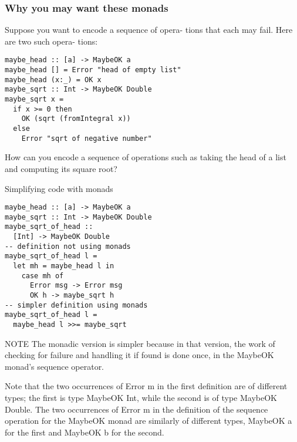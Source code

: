 \subsubsection{Why you may want these monads}
Suppose you want to encode a sequence of opera-
tions that each may fail. Here are two such opera-
tions:
\begin{lstlisting}
maybe_head :: [a] -> MaybeOK a
maybe_head [] = Error "head of empty list"
maybe_head (x:_) = OK x
maybe_sqrt :: Int -> MaybeOK Double
maybe_sqrt x =
  if x >= 0 then
    OK (sqrt (fromIntegral x))
  else
    Error "sqrt of negative number"
\end{lstlisting}
How can you encode a sequence of operations such
as taking the head of a list and computing its square
root?

Simplifying code with monads
\begin{lstlisting}
maybe_head :: [a] -> MaybeOK a
maybe_sqrt :: Int -> MaybeOK Double
maybe_sqrt_of_head ::
  [Int] -> MaybeOK Double
-- definition not using monads
maybe_sqrt_of_head l =
  let mh = maybe_head l in
    case mh of
      Error msg -> Error msg
      OK h -> maybe_sqrt h
-- simpler definition using monads
maybe_sqrt_of_head l =
  maybe_head l >>= maybe_sqrt
\end{lstlisting}
NOTE The monadic version is simpler because in
that version, the work of checking for failure and
handling it if found is done once, in the MaybeOK
monad’s sequence operator.

Note that the two occurrences of Error m in the
first definition are of different types; the first is type
MaybeOK Int, while the second is of type MaybeOK
Double. The two occurrences of Error m in the
definition of the sequence operation for the MaybeOK
monad are similarly of different types, MaybeOK a
for the first and MaybeOK b for the second.

